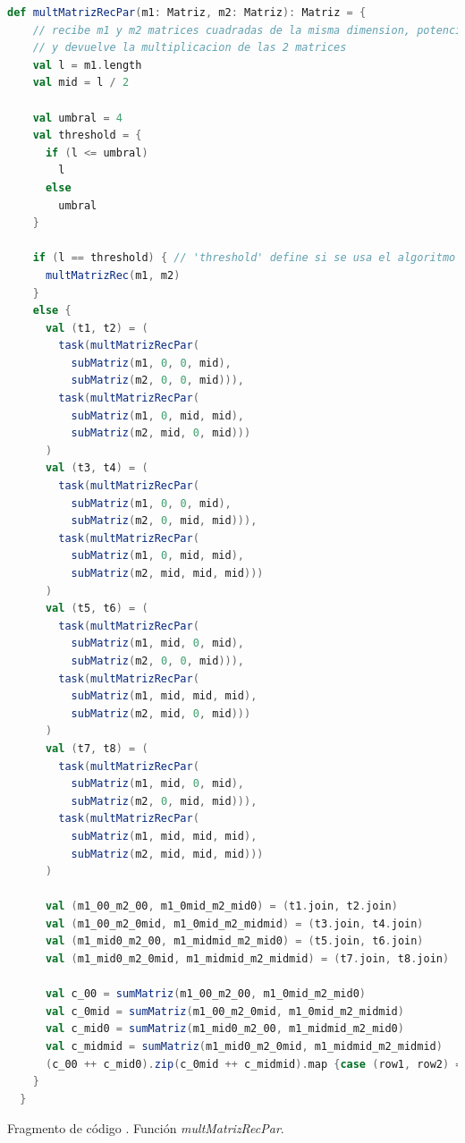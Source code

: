 \documentclass{article}
\newcounter{codesnippet}
\newcommand{\newcodesnippet}{%
  \stepcounter{codesnippet}%
}
\begin{document}
\newcodesnippet
\begin{lstlisting}[language=Scala]
  def multMatrizRecPar(m1: Matriz, m2: Matriz): Matriz = {
    // recibe m1 y m2 matrices cuadradas de la misma dimension, potencia de 2
    // y devuelve la multiplicacion de las 2 matrices
    val l = m1.length
    val mid = l / 2

    val umbral = 4
    val threshold = {
      if (l <= umbral)
        l
      else
        umbral
    }

    if (l == threshold) { // 'threshold' define si se usa el algoritmo secuencial o paralelo.
      multMatrizRec(m1, m2)
    }
    else {
      val (t1, t2) = (
        task(multMatrizRecPar(
          subMatriz(m1, 0, 0, mid),
          subMatriz(m2, 0, 0, mid))),
        task(multMatrizRecPar(
          subMatriz(m1, 0, mid, mid),
          subMatriz(m2, mid, 0, mid)))
      )
      val (t3, t4) = (
        task(multMatrizRecPar(
          subMatriz(m1, 0, 0, mid),
          subMatriz(m2, 0, mid, mid))),
        task(multMatrizRecPar(
          subMatriz(m1, 0, mid, mid),
          subMatriz(m2, mid, mid, mid)))
      )
      val (t5, t6) = (
        task(multMatrizRecPar(
          subMatriz(m1, mid, 0, mid),
          subMatriz(m2, 0, 0, mid))),
        task(multMatrizRecPar(
          subMatriz(m1, mid, mid, mid),
          subMatriz(m2, mid, 0, mid)))
      )
      val (t7, t8) = (
        task(multMatrizRecPar(
          subMatriz(m1, mid, 0, mid),
          subMatriz(m2, 0, mid, mid))),
        task(multMatrizRecPar(
          subMatriz(m1, mid, mid, mid),
          subMatriz(m2, mid, mid, mid)))
      )

      val (m1_00_m2_00, m1_0mid_m2_mid0) = (t1.join, t2.join)
      val (m1_00_m2_0mid, m1_0mid_m2_midmid) = (t3.join, t4.join)
      val (m1_mid0_m2_00, m1_midmid_m2_mid0) = (t5.join, t6.join)
      val (m1_mid0_m2_0mid, m1_midmid_m2_midmid) = (t7.join, t8.join)

      val c_00 = sumMatriz(m1_00_m2_00, m1_0mid_m2_mid0)
      val c_0mid = sumMatriz(m1_00_m2_0mid, m1_0mid_m2_midmid)
      val c_mid0 = sumMatriz(m1_mid0_m2_00, m1_midmid_m2_mid0)
      val c_midmid = sumMatriz(m1_mid0_m2_0mid, m1_midmid_m2_midmid)
      (c_00 ++ c_mid0).zip(c_0mid ++ c_midmid).map {case (row1, row2) => row1 ++ row2}
    }
  }
\end{lstlisting}
\begin{center}
    \small{Fragmento de código \thecodesnippet. Función \textit{multMatrizRecPar}.}
\end{center}
\end{document}
